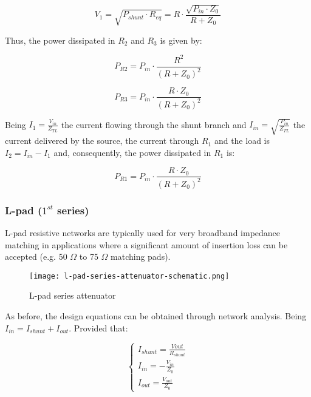 \begin{equation}
    V_{1} = \sqrt{P_{shunt} \cdot R_{eq}} = R \cdot \frac{\sqrt{P_{in} \cdot Z_0}}{R + Z_0}
\end{equation}

\noindent Thus, the power dissipated in $R_2$ and $R_3$ is given by:

\begin{equation}
    P_{R2} = P_{in} \cdot \frac{R^2}{(R + Z_0)^2}
\end{equation}

\begin{equation}
    P_{R3} = P_{in} \cdot \frac{R \cdot Z_0}{(R + Z_0)^2}
\end{equation}

\noindent Being $I_1 = \frac{V_{in}}{Z_{TL}}$ the current flowing through the shunt branch and $I_{in} = \sqrt{\frac{P_{in}}{Z_{TL}}}$ the current delivered by the source, the current through $R_1$ and the load is $I_2 = I_{in} - I_1$ and, consequently, the power dissipated in $R_1$ is:

\begin{equation}
    P_{R1} = P_{in} \cdot \frac {R \cdot Z_0}{(R+Z_0)^2}
\end{equation}
\subsubsection{L-pad ($1^{st}$ series)}

\noindent L-pad resistive networks are typically used for very broadband impedance matching in applications where a significant amount of insertion loss can be accepted (e.g. 50 $\Omega$ to 75 $\Omega$ matching pads).

\begin{figure}[ht]
    \centering
    \texttt{[image: l-pad-series-attenuator-schematic.png]}
    \caption{L-pad series attenuator}
    \label{fig:l-pad-series-attenuator-schematic}
\end{figure}

\noindent As before, the design equations can be obtained through network analysis. Being $I_{in} = I_{shunt} + I_{out}$. Provided that:

\begin{equation}
    \begin{cases} I_{shunt} = \frac{Vout}{R_{shunt}} \\ I_{in} = - \frac{V_{in}}{Z_0} \\ I_{out} = \frac{V_{out}}{Z_0} \end{cases}
\end{equation}


